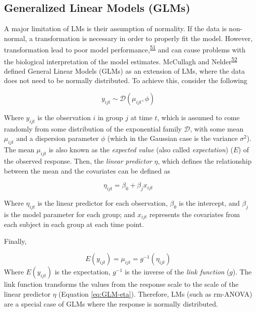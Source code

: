 \documentclass[
]{article}
\begin{document}
\hypertarget{generalized-linear-models-glms}{%
\subsection{Generalized Linear Models (GLMs)}\label{generalized-linear-models-glms}}

A major limitation of LMs is their assumption of normality. If the data is non-normal, a transformation is necessary in order to properly fit the model. However, transformation lead to poor model performance,\textsuperscript{\protect\hyperlink{ref-ohara2010}{51}} and can cause problems with the biological interpretation of the model estimates. McCullagh and Nelder\textsuperscript{\protect\hyperlink{ref-nelder1972}{52}} defined General Linear Models (GLMs) as an extension of LMs, where the data does not need to be normally distributed. To achieve this, consider the following

\begin{equation}
y_{ijt} \sim \mathcal{D}(\mu_{ijt},\phi)
\label{eq:GLM-y}
\end{equation}

Where \(y_{ijt}\) is the observation \(i\) in group \(j\) at time \(t\), which is assumed to come randomly from some distribution of the exponential family \(\mathcal{D}\), with some mean \(\mu_{ijt}\) and a dispersion parameter \(\phi\) (which in the Gaussian case is the variance \(\sigma^{2}\)). The mean \(\mu_{ijt}\) is also known as the \emph{expected value} (also called \emph{expectation}) (\(E\)) of the observed response. Then, the \emph{linear predictor} \(\eta\), which defines the relationship between the mean and the covariates can be defined as

\begin{equation}
\eta_{ijt}=\beta_0+\beta_{j}x_{ijt}
\label{eq:GLM-eta}
\end{equation}

Where \(\eta_{ijt}\) is the linear predictor for each observation, \(\beta_0\) is the intercept, and \(\beta_{j}\) is the model parameter for each group; and \(x_{ijt}\) represents the covariates from each subject in each group at each time point.

Finally,

\begin{equation}
E(y_{ijt})=\mu_{ijt}=g^{-1}(\eta_{ijt})
\label{eq:GLM-Expectation}
\end{equation}
Where \(E(y_{ijt})\) is the expectation, \(g^{-1}\) is the inverse of the \emph{link function} (\(g\)). The link function transforms the values from the response scale to the scale of the linear predictor \(\eta\) (Equation \eqref{eq:GLM-eta}). Therefore, LMs (such as rm-ANOVA) are a special case of GLMs where the response is normally distributed.
\end{document}
